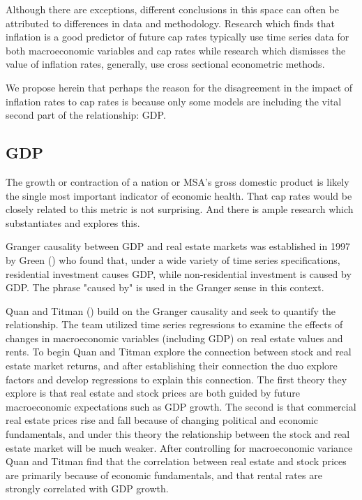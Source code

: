 Although there are exceptions, different conclusions in this space can often be attributed to differences in data and methodology. Research which finds that inflation is a good predictor of future cap rates typically use time series data for both macroeconomic variables and cap rates while research which dismisses the value of inflation rates, generally, use cross sectional econometric methods.

We propose herein that perhaps the reason for the disagreement in the impact of inflation rates to cap rates is because only some models are including the vital second part of the relationship: GDP.


\subsection{GDP}

The growth or contraction of a nation or MSA's gross domestic product is likely the single most important indicator of economic health. That cap rates would be closely related to this metric is not surprising. And there is ample research which substantiates and explores this.

Granger causality between GDP and real estate markets was established in 1997 by Green (\citeyear{green1997follow}) who found that, under a wide variety of time series specifications, residential investment causes GDP, while non-residential investment is caused by GDP. The phrase "caused by" is used in the Granger sense in this context. 

Quan and Titman (\citeyear{quan1997commercial}) build on the Granger causality and seek to quantify the relationship. The team utilized time series regressions to examine the effects of changes in macroeconomic variables (including GDP) on real estate values and rents. To begin Quan and Titman explore the connection between stock and real estate market returns, and after establishing their connection the duo explore factors and develop regressions to explain this connection. The first theory they explore is that real estate and stock prices are both guided by future macroeconomic expectations such as GDP growth. The second is that commercial real estate prices rise and fall because of changing political and economic fundamentals, and under this theory the relationship between the stock and real estate market will be much weaker. After controlling for macroeconomic variance Quan and Titman find that the correlation between real estate and stock prices are primarily because of economic fundamentals, and that rental rates are strongly correlated with GDP growth.

